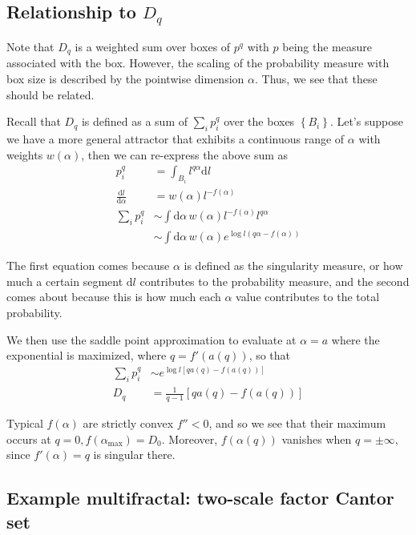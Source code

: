 \documentclass[10pt]{article}
\newcommand{\rd}[2]{\frac{\mathrm{d}#1}{\mathrm{d}#2}}
\begin{document}
\subsection{Relationship to $D_q$}

Note that $D_q$ is a weighted sum over boxes of $p^q$ with $p$ being the measure
associated with the box. However, the scaling of the probability measure with
box size is described by the pointwise dimension $\alpha$. Thus, we see that
these should be related.

Recall that $D_q$ is defined as a sum of $\sum\limits_{i}^{}p_i^q$ over the
boxes $\left\{ B_i \right\}$. Let's suppose we have a more general attractor
that exhibits a continuous range of $\alpha$ with weights $w(\alpha)$, then we
can re-express the above sum as
\begin{align}
    p_i^q &= \int_{B_i} l^{q\alpha}\mathrm{d}l\\
    \rd{l}{\alpha} &= w(\alpha)l^{-f(\alpha)}\\
    \sum\limits_{i}^{} p_i^q &\sim
        \int \mathrm{d}\alpha\, w(\alpha) l^{-f(\alpha)} l^{q\alpha}\\
        &\sim
        \int \mathrm{d}\alpha\, w(\alpha) e^{\log l(q\alpha - f(\alpha))}
\end{align}

The first equation comes because $\alpha$ is defined as the singularity measure,
or how much a certain segment $\mathrm{d}l$ contributes to the probability
measure, and the second comes about because this is how much each $\alpha$
value contributes to the total probability.

We then use the saddle point approximation to evaluate at $\alpha = a$ where the
exponential is maximized, where $q = f'(a(q))$, so that
\begin{align}
    \sum\limits_{i}^{}p_i^q &\sim e^{\log l\left[ qa(q) - f(a(q)) \right]}\\
    D_q &= \frac{1}{q-1}\left[ q a(q) - f(a(q)) \right]
\end{align}

Typical $f(\alpha)$ are strictly convex $f'' < 0$, and so we see that their
maximum occurs at $q=0, f(\alpha_{\max}) = D_0$. Moreover, $f(\alpha(q))$
vanishes when $q = \pm \infty$, since $f'(\alpha) = q$ is singular there.

\subsection{Example multifractal: two-scale factor Cantor set}
\end{document}
